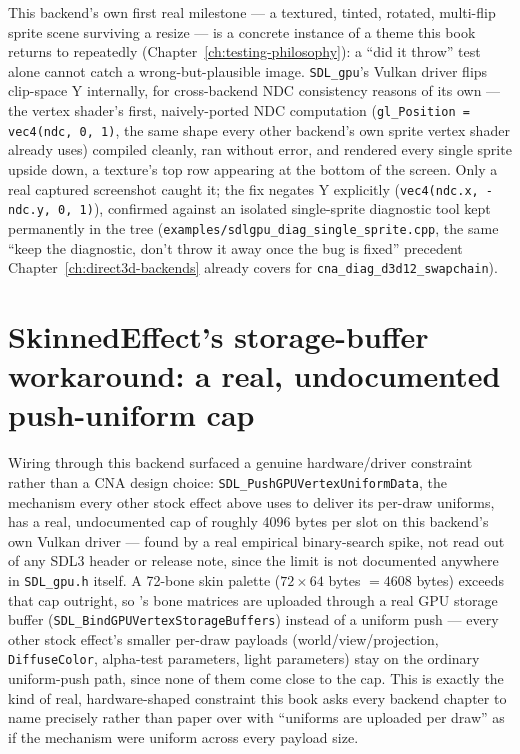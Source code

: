 This backend's own first real milestone --- a textured, tinted, rotated, multi-flip sprite
scene surviving a resize --- is a concrete instance of a theme this book returns to
repeatedly (Chapter~\ref{ch:testing-philosophy}): a ``did it throw'' test alone cannot catch a
wrong-but-plausible image. \texttt{SDL\_gpu}'s Vulkan driver flips clip-space Y internally, for
cross-backend NDC consistency reasons of its own --- the vertex shader's first, naively-ported
NDC computation (\texttt{gl\_Position = vec4(ndc, 0, 1)}, the same shape every other backend's
own sprite vertex shader already uses) compiled cleanly, ran without error, and rendered every
single sprite upside down, a texture's top row appearing at the bottom of the screen. Only a
real captured screenshot caught it; the fix negates Y explicitly
(\texttt{vec4(ndc.x, -ndc.y, 0, 1)}), confirmed against an isolated single-sprite diagnostic
tool kept permanently in the tree (\texttt{examples/sdlgpu\_diag\_single\_sprite.cpp}, the same
``keep the diagnostic, don't throw it away once the bug is fixed'' precedent
Chapter~\ref{ch:direct3d-backends} already covers for \texttt{cna\_diag\_d3d12\_swapchain}).

\section{SkinnedEffect's storage-buffer workaround: a real, undocumented push-uniform cap}

Wiring  through this backend surfaced a genuine hardware/driver
constraint rather than a CNA design choice: \texttt{SDL\_PushGPUVertexUniformData}, the
mechanism every other stock effect above uses to deliver its per-draw uniforms, has a real,
undocumented cap of roughly 4096 bytes per slot on this backend's own Vulkan driver --- found by
a real empirical binary-search spike, not read out of any SDL3 header or release note, since
the limit is not documented anywhere in \texttt{SDL\_gpu.h} itself. A 72-bone skin palette
(\(72 \times 64\) bytes \(= 4608\) bytes) exceeds that cap outright, so
's bone matrices are uploaded through a real GPU storage buffer
(\texttt{SDL\_BindGPUVertexStorageBuffers}) instead of a uniform push --- every other stock
effect's smaller per-draw payloads (world/view/projection, \texttt{DiffuseColor}, alpha-test
parameters, light parameters) stay on the ordinary uniform-push path, since none of them come
close to the cap. This is exactly the kind of real, hardware-shaped constraint this book asks
every backend chapter to name precisely rather than paper over with ``uniforms are uploaded
per draw'' as if the mechanism were uniform across every payload size.


